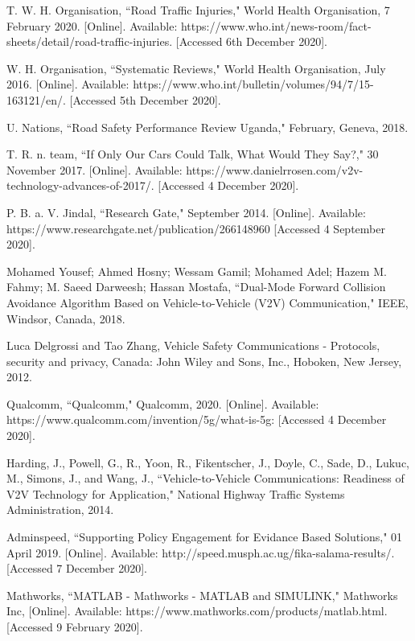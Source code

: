 \documentclass[12pt]{report}
\begin{document}
\begin{thebibliography}{1}
	
	T. W. H. Organisation, “Road Traffic Injuries," World Health Organisation, 7 February 2020. [Online]. Available: https://www.who.int/news-room/fact-sheets/detail/road-traffic-injuries. [Accessed 6th December 2020].
	
	 W. H. Organisation, “Systematic Reviews," World Health Organisation, July 2016. [Online]. Available: https://www.who.int/bulletin/volumes/94/7/15-163121/en/. [Accessed 5th December 2020].
	
	U. Nations, “Road Safety Performance Review Uganda," February, Geneva, 2018.
	
	T. R. n. team, “If Only Our Cars Could Talk, What Would They Say?," 30 November 2017. [Online]. Available: https://www.danielrrosen.com/v2v-technology-advances-of-2017/. [Accessed 4 December 2020].
	
	P. B. a. V. Jindal, “Research Gate," September 2014. [Online]. Available: https://www.researchgate.net/publication/266148960 [Accessed 4 September 2020].
	
	Mohamed Yousef; Ahmed Hosny; Wessam Gamil; Mohamed Adel; Hazem M. Fahmy; M. Saeed Darweesh; Hassan Mostafa, “Dual-Mode Forward Collision Avoidance Algorithm Based on Vehicle-to-Vehicle (V2V) Communication," IEEE, Windsor, Canada, 2018.
	
	Luca Delgrossi and Tao Zhang, Vehicle Safety Communications - Protocols, security and privacy, Canada: John Wiley and Sons, Inc., Hoboken, New Jersey, 2012. 
	
	Qualcomm, “Qualcomm," Qualcomm, 2020. [Online]. Available: https://www.qualcomm.com/invention/5g/what-is-5g: [Accessed 4 December 2020].
	
	Harding, J., Powell, G., R., Yoon, R., Fikentscher, J., Doyle, C., Sade, D., Lukuc, M., Simons, J., and Wang, J., “Vehicle-to-Vehicle Communications: Readiness of V2V Technology for Application," National Highway Traffic Systems Administration, 2014.
	
	Adminspeed, “Supporting Policy Engagement for Evidance Based Solutions," 01 April 2019. [Online]. Available: http://speed.musph.ac.ug/fika-salama-results/. [Accessed 7 December 2020].
	
	Mathworks, “MATLAB - Mathworks - MATLAB and SIMULINK," Mathworks Inc, [Online]. Available: https://www.mathworks.com/products/matlab.html. [Accessed 9 February 2020].
	
	
\end{thebibliography}
\end{document}
